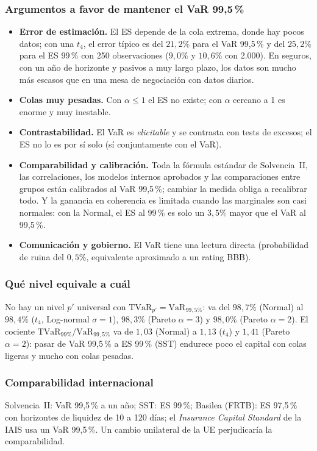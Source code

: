 \documentclass[a4paper,12pt]{article}
\newcommand{\VaR}{\mathrm{VaR}}
\newcommand{\TVaR}{\mathrm{TVaR}}
\begin{document}
\subsubsection*{Argumentos a favor de mantener el VaR 99,5\,\%}
\begin{itemize}[leftmargin=*,itemsep=2pt]
\item \textbf{Error de estimaci\'on.} El ES depende de la cola extrema, donde hay pocos datos; con una $t_4$, el error t\'ipico es del $21{,}2\%$ para el VaR 99,5\,\% y del $25{,}2\%$ para el ES 99\,\% con 250 observaciones ($9{,}0\%$ y $10{,}6\%$ con 2.000). En seguros, con un a\~no de horizonte y pasivos a muy largo plazo, los datos son mucho m\'as escasos que en una mesa de negociaci\'on con datos diarios.
\item \textbf{Colas muy pesadas.} Con $\alpha\le1$ el ES no existe; con $\alpha$ cercano a 1 es enorme y muy inestable.
\item \textbf{Contrastabilidad.} El VaR es \emph{elicitable} y se contrasta con tests de excesos; el ES no lo es por s\'i solo (s\'i conjuntamente con el VaR).
\item \textbf{Comparabilidad y calibraci\'on.} Toda la f\'ormula est\'andar de Solvencia~II, las correlaciones, los modelos internos aprobados y las comparaciones entre grupos est\'an calibrados al VaR 99,5\,\%; cambiar la medida obliga a recalibrar todo. Y la ganancia en coherencia es limitada cuando las marginales son casi normales: con la Normal, el ES al 99\,\% es solo un $3{,}5\%$ mayor que el VaR al 99,5\,\%.
\item \textbf{Comunicaci\'on y gobierno.} El VaR tiene una lectura directa (probabilidad de ruina del $0{,}5\%$, equivalente aproximado a un rating BBB).
\end{itemize}

\subsubsection*{Qu\'e nivel equivale a cu\'al}
No hay un nivel $p'$ universal con $\TVaR_{p'}=\VaR_{99{,}5\%}$: va del $98{,}7\%$ (Normal) al $98{,}4\%$ ($t_4$, Log-normal $\sigma=1$), $98{,}3\%$ (Pareto $\alpha=3$) y $98{,}0\%$ (Pareto $\alpha=2$). El cociente $\TVaR_{99\%}/\VaR_{99{,}5\%}$ va de $1{,}03$ (Normal) a $1{,}13$ ($t_4$) y $1{,}41$ (Pareto $\alpha=2$): pasar de VaR 99,5\,\% a ES 99\,\% (SST) endurece poco el capital con colas ligeras y mucho con colas pesadas.

\subsubsection*{Comparabilidad internacional}
Solvencia~II: VaR 99,5\,\% a un a\~no; SST: ES 99\,\%; Basilea (FRTB): ES 97,5\,\% con horizontes de liquidez de 10 a 120 d\'ias; el \emph{Insurance Capital Standard} de la IAIS usa un VaR 99,5\,\%. Un cambio unilateral de la UE perjudicar\'ia la comparabilidad.
\end{document}
